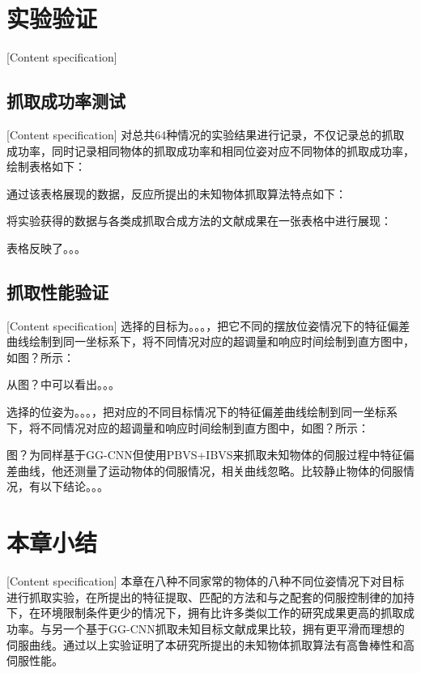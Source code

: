 \documentclass[fontset=fandol,type=bachelor,campus=harbin]{hithesisbook}
\begin{document}
\section{实验验证}[Content specification]
\subsection{抓取成功率测试}[Content specification]
对总共64种情况的实验结果进行记录，不仅记录总的抓取成功率，同时记录相同物体的抓取成功率和相同位姿对应不同物体的抓取成功率，绘制表格如下：


通过该表格展现的数据，反应所提出的未知物体抓取算法特点如下：


将实验获得的数据与各类成抓取合成方法的文献成果在一张表格中进行展现：


表格反映了。。。
\subsection{抓取性能验证}[Content specification]
选择的目标为。。。，把它不同的摆放位姿情况下的特征偏差曲线绘制到同一坐标系下，将不同情况对应的超调量和响应时间绘制到直方图中，如图？所示：


从图？中可以看出。。。


选择的位姿为。。。，把对应的不同目标情况下的特征偏差曲线绘制到同一坐标系下，将不同情况对应的超调量和响应时间绘制到直方图中，如图？所示：


图？为同样基于GG-CNN但使用PBVS+IBVS来抓取未知物体的伺服过程中特征偏差曲线，他还测量了运动物体的伺服情况，相关曲线忽略。比较静止物体的伺服情况，有以下结论。。。
\section{本章小结}[Content specification]
本章在八种不同家常的物体的八种不同位姿情况下对目标进行抓取实验，在所提出的特征提取、匹配的方法和与之配套的伺服控制律的加持下，在环境限制条件更少的情况下，拥有比许多类似工作的研究成果更高的抓取成功率。与另一个基于GG-CNN抓取未知目标文献成果比较，拥有更平滑而理想的伺服曲线。通过以上实验证明了本研究所提出的未知物体抓取算法有高鲁棒性和高伺服性能。
%
\end{document}
